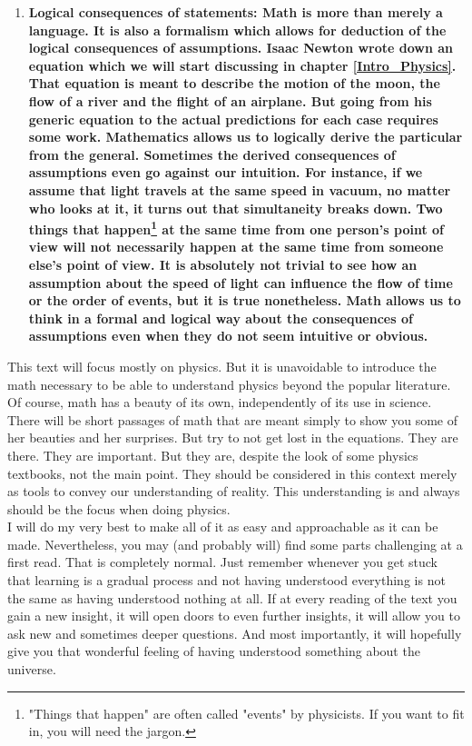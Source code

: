 \begin{enumerate}
	\item \bfseries Logical consequences of statements: \normalfont Math is more than merely a language. It is also a formalism which allows for deduction of the logical consequences of assumptions. Isaac Newton wrote down an equation which we will start discussing in chapter \ref{Intro_Physics}. That equation is meant to describe the motion of the moon, the flow of a river and the flight of an airplane. But going from his generic equation to the actual predictions for each case requires some work. Mathematics allows us to logically derive the particular from the general. Sometimes the derived consequences of assumptions even go against our intuition. For instance, if we assume that light travels at the same speed in vacuum, no matter who looks at it, it turns out that simultaneity breaks down. Two things that happen\footnote{"Things that happen" are often called "events" by physicists. If you want to fit in, you will need the jargon.} at the same time from one person's point of view will not necessarily happen at the same time from someone else's point of view. It is absolutely not trivial to see how an assumption about the speed of light can influence the flow of time or the order of events, but it is true nonetheless. Math allows us to think in a formal and logical way about the consequences of assumptions even when they do not seem intuitive or obvious.
\end{enumerate}
This text will focus mostly on physics. But it is unavoidable to introduce the math necessary to be able to understand physics beyond the popular literature. Of course, math has a beauty of its own, independently of its use in science. There will be short passages of math that are meant simply to show you some of her beauties and her surprises. But try to not get lost in the equations. They are there. They are important. But they are, despite the look of some physics textbooks, not the main point. They should be considered in this context merely as tools to convey our understanding of reality. This understanding is and always should be the focus when doing physics.\\

\noindent I will do my very best to make all of it as easy and approachable as it can be made. Nevertheless, you may (and probably will) find some parts challenging at a first read. That is completely normal. Just remember whenever you get stuck that learning is a gradual process and not having understood everything is not the same as having understood nothing at all. If at every reading of the text you gain a new insight, it will open doors to even further insights, it will allow you to ask new and sometimes deeper questions. And most importantly, it will hopefully give you that wonderful feeling of having understood something about the universe.